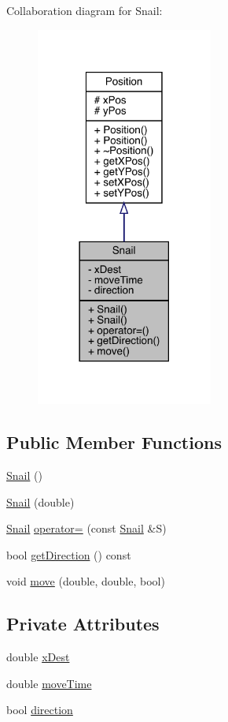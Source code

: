 Collaboration diagram for Snail\+:
\nopagebreak
\begin{figure}[H]
\begin{center}
\leavevmode
\includegraphics[width=165pt]{class_snail__coll__graph}
\end{center}
\end{figure}
\subsection*{Public Member Functions}
\begin{DoxyCompactItemize}
\item 
\mbox{\hyperlink{class_snail_ac5501ca7ead01b2ba0b7286503599f68}{Snail}} ()
\item 
\mbox{\hyperlink{class_snail_a89de76e5c6b4087c0ed7ac2809f0c45b}{Snail}} (double)
\item 
\mbox{\hyperlink{class_snail}{Snail}} \mbox{\hyperlink{class_snail_a107c53b3f7917e1b31134bf6064af32c}{operator=}} (const \mbox{\hyperlink{class_snail}{Snail}} \&S)
\item 
bool \mbox{\hyperlink{class_snail_a1cc5dc295038ac11f138ac49cdcfffc3}{get\+Direction}} () const
\item 
void \mbox{\hyperlink{class_snail_a7db73c2ca4146c04e7e37e444c15b08d}{move}} (double, double, bool)
\end{DoxyCompactItemize}
\subsection*{Private Attributes}
\begin{DoxyCompactItemize}
\item 
double \mbox{\hyperlink{class_snail_ab24202a09a2bfc54a801d963bab10a34}{x\+Dest}}
\item 
double \mbox{\hyperlink{class_snail_a16550c11e1c28bdd178cc0300436f054}{move\+Time}}
\item 
bool \mbox{\hyperlink{class_snail_aa0ebca6e0094ccfac4909f8f47323e2d}{direction}}
\end{DoxyCompactItemize}
